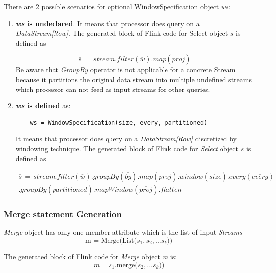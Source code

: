 There are 2 possible scenarios for optional WindowSpecification object \textit{ws}:
\begin{enumerate}
	\item \textbf{\textit{ws} is undeclared}. It means that processor does query on a \textit{DataStream[Row]}.  The generated block of Flink code for Select object $s$ is defined as
	
	\begin{equation}
	\overline{s}\, =\,\overline{stream} .filter(\overline{w}).map(\overline{proj})
\end{equation}
	Be aware that \textit{GroupBy} operator is not applicable for a concrete Stream because it partitions the original data stream into multiple undefined streams which processor can not feed as input streams for other queries. 
	
	\item \textbf{\textit{ws} is defined} as:
		\begin{lstlisting} 
	ws = WindowSpecification(size, every, partitioned)
\end{lstlisting}
It means that processor does query on a \textit{DataStream[Row]} discretized by windowing technique. The generated block of Flink code for \textit{Select} object $s$ is defined as


\begin{multline}
	\overline{s}\, =\,\overline{stream} .filter(\overline{w}).groupBy(\overline{by}).map(\overline{proj})	.window(\overline{size}).every(\overline{every}) \\
	.groupBy(\overline{partitioned}).mapWindow(\overline{proj}).flatten
\end{multline} 


	
\end{enumerate}


\subsubsection*{Merge statement Generation}

\textit{Merge} object has only one member attribute which is the list of input \textit{Streams}
\begin{equation}
	\textrm{m = Merge(List(} s_1, s_2, ...s_k \textrm{))}
\end{equation}

The generated block of Flink code for \textit{Merge} object \textit{m} is:
\begin{equation}
	\overline{m} = \overline{s_1}\textrm{.merge(}\overline{s_2}, ...\overline{s_k} \textrm{))}
\end{equation}

